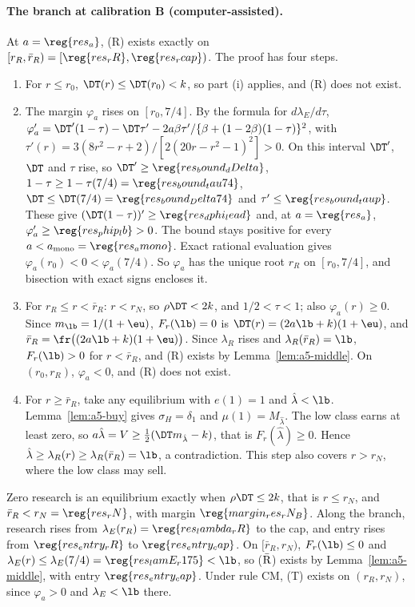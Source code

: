 \paragraph{The branch at calibration B (computer-assisted).}
At \(a=\reg{res_a}\), (R) exists exactly on \([r_R,\bar r_R)=[\reg{res_rR},\reg{res_rcap})\). The proof has four
steps.
\begin{enumerate}[leftmargin=2em]
\item For \(r\le r_0\), \(\DT(r)\le\DT(r_0)<k\), so part (i) applies, and (R) does not exist.
\item The margin \(\varphi_{a}\) rises on \([r_0,7/4]\). By the formula for \(d\lambda_E/d\tau\),
\(\varphi_a'=\DT'(1-\tau)-\DT\tau'-2a\beta\tau'/\{\beta+(1-2\beta)(1-\tau)\}^2\), with
\(\tau'(r)=3(8r^2-r+2)/[2(20r-r^2-1)^2]>0\). On this interval \(\DT'\), \(\DT\) and \(\tau\) rise, so
\(\DT'\ge\reg{res_bound_dDelta}\), \(1-\tau\ge1-\tau(7/4)=\reg{res_bound_tau74}\), \(\DT\le\DT(7/4)=\reg{res_bound_Delta74}\)
and \(\tau'\le\reg{res_bound_taup}\). These give \((\DT(1-\tau))'\ge\reg{res_dphi_lead}\) and, at
\(a=\reg{res_a}\), \(\varphi_a'\ge\reg{res_phip_lb}>0\). The bound stays positive for every
\(a<a_{\rm mono}=\reg{res_amono}\). Exact rational evaluation gives \(\varphi_a(r_0)<0<\varphi_a(7/4)\). So
\(\varphi_a\) has the unique root \(r_R\) on \([r_0,7/4]\), and bisection with exact signs encloses it.
\item For \(r_R\le r<\bar r_R\): \(r<r_N\), so \(\rho\DT<2k\), and \(1/2<\tau<1\); also \(\varphi_a(r)\ge0\). Since
\(m_{\lb}=1/(1+\eu)\), \(F_r(\lb)=0\) is \(\DT(r)=(2a\lb+k)(1+\eu)\), and \(\bar r_R=\fr\bigl((2a\lb+k)(1+\eu)\bigr)\).
Since \(\lambda_R\) rises and \(\lambda_R(\bar r_R)=\lb\), \(F_r(\lb)>0\) for \(r<\bar r_R\), and (R) exists by
Lemma~\ref{lem:a5-middle}. On \((r_0,r_R)\), \(\varphi_a<0\), and (R) does not exist.
\item For \(r\ge\bar r_R\), take any equilibrium with \(e(1)=1\) and \(\hat\lambda<\lb\). Lemma~\ref{lem:a5-buy}
gives \(\sigma_H=\delta_1\) and \(\mu(1)=M_{\hat\lambda}\). The low class earns at least zero, so
\(a\hat\lambda=V\ge\tfrac12(\DT m_{\hat\lambda}-k)\), that is \(F_r(\hat\lambda)\ge0\). Hence
\(\hat\lambda\ge\lambda_R(r)\ge\lambda_R(\bar r_R)=\lb\), a contradiction. This step also covers \(r>r_N\), where the
low class may sell.
\end{enumerate}
Zero research is an equilibrium exactly when \(\rho\DT\le2k\), that is \(r\le r_N\), and
\(\bar r_R<r_N=\reg{res_rN}\), with margin \(\reg{margin_res_rN_B}\). Along the branch, research rises from
\(\lambda_E(r_R)=\reg{res_lambda_rR}\) to the cap, and entry rises from \(\reg{res_entry_rR}\) to
\(\reg{res_entry_cap}\). On \([\bar r_R,r_N)\), \(F_r(\lb)\le0\) and \(\lambda_E(r)\le\lambda_E(7/4)=\reg{res_lamE_r175}<\lb\),
so (\(\bar{\rm R}\)) exists by Lemma~\ref{lem:a5-middle}, with entry \(\reg{res_entry_cap}\). Under rule CM, (T) exists on
\((r_R,r_N)\), since \(\varphi_a>0\) and \(\lambda_E<\lb\) there.

